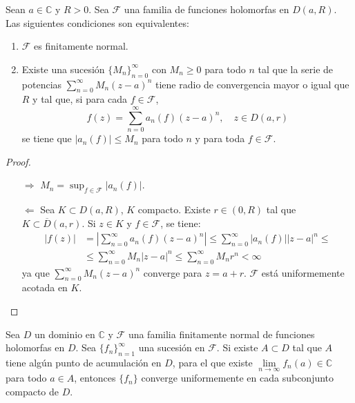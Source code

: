 \begin{theorem}
    Sean $a \in \mathbb{C}$ y $R > 0$.
    Sea $\mathcal{F}$ una familia de funciones holomorfas en $D(a, R)$.
    Las siguientes condiciones son equivalentes:
    \begin{enumerate}
        \item $\mathcal{F}$ es finitamente normal.
        \item Existe una sucesión $\{M_n\}_{n=0}^\infty$ con $M_n \geq 0$ para todo $n$ tal que la serie de potencias $\sum_{n=0}^\infty M_n(z-a)^n$ tiene radio de convergencia mayor o igual que $R$ y tal que, si para cada $f \in \mathcal{F}$,
              $$f(z) = \sum_{n=0}^\infty a_n(f)(z-a)^n, \quad z \in D(a, r)$$
              se tiene que $|a_n(f)| \leq M_n$ para todo $n$ y para toda $f \in \mathcal{F}$.
    \end{enumerate}
\end{theorem}

\begin{proof}
    \hfill
    \begin{itemize}
        \item[$\Rightarrow$] $M_n = \sup_{f \in \mathcal{F}} |a_n(f)|$.
        \item[$\Leftarrow$] Sea $K \subset D(a, R)$, $K$ compacto.
            Existe $r \in (0, R)$ tal que $K \subset \overline{D}(a, r)$.
            Si $z \in K$ y $f \in \mathcal{F}$, se tiene:
            \begin{align*}
                |f(z)| & = \left|\sum_{n=0}^\infty a_n(f)(z-a)^n\right| \leq \sum_{n=0}^\infty |a_n(f)||z-a|^n \leq \\
                       & \leq \sum_{n=0}^\infty M_n|z-a|^n \leq \sum_{n=0}^\infty M_nr^n < \infty
            \end{align*}
            ya que $\sum_{n=0}^\infty M_n(z-a)^n$ converge para $z = a+r$.
            $\mathcal{F}$ está uniformemente acotada en $K$.
    \end{itemize}
\end{proof}

\begin{theorem}
    Sea $D$ un dominio en $\mathbb{C}$ y $\mathcal{F}$ una familia finitamente normal de funciones holomorfas en $D$.
    Sea $\{f_n\}_{n=1}^\infty$ una sucesión en $\mathcal{F}$.
    Si existe $A \subset D$ tal que $A$ tiene algún punto de acumulación en $D$, para el que existe $\lim\limits_{n \to \infty} f_n(a) \in \mathbb{C}$ para todo $a \in A$, entonces $\{f_n\}$ converge uniformemente en cada subconjunto compacto de $D$.
\end{theorem}

